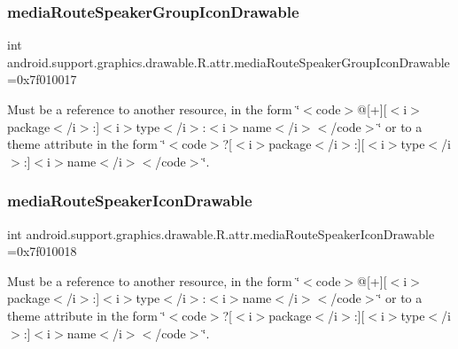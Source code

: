 \subsubsection{\texorpdfstring{media\+Route\+Speaker\+Group\+Icon\+Drawable}{mediaRouteSpeakerGroupIconDrawable}}
{\footnotesize\ttfamily int android.\+support.\+graphics.\+drawable.\+R.\+attr.\+media\+Route\+Speaker\+Group\+Icon\+Drawable =0x7f010017\hspace{0.3cm}{\ttfamily [static]}}

Must be a reference to another resource, in the form \char`\"{}$<$code$>$@\mbox{[}+\mbox{]}\mbox{[}$<$i$>$package$<$/i$>$\+:\mbox{]}$<$i$>$type$<$/i$>$\+:$<$i$>$name$<$/i$>$$<$/code$>$\char`\"{} or to a theme attribute in the form \char`\"{}$<$code$>$?\mbox{[}$<$i$>$package$<$/i$>$\+:\mbox{]}\mbox{[}$<$i$>$type$<$/i$>$\+:\mbox{]}$<$i$>$name$<$/i$>$$<$/code$>$\char`\"{}. \mbox{\label{classandroid_1_1support_1_1graphics_1_1drawable_1_1R_1_1attr_a91dd45a9d20abff52cb43846801486ed}} 
\subsubsection{\texorpdfstring{media\+Route\+Speaker\+Icon\+Drawable}{mediaRouteSpeakerIconDrawable}}
{\footnotesize\ttfamily int android.\+support.\+graphics.\+drawable.\+R.\+attr.\+media\+Route\+Speaker\+Icon\+Drawable =0x7f010018\hspace{0.3cm}{\ttfamily [static]}}

Must be a reference to another resource, in the form \char`\"{}$<$code$>$@\mbox{[}+\mbox{]}\mbox{[}$<$i$>$package$<$/i$>$\+:\mbox{]}$<$i$>$type$<$/i$>$\+:$<$i$>$name$<$/i$>$$<$/code$>$\char`\"{} or to a theme attribute in the form \char`\"{}$<$code$>$?\mbox{[}$<$i$>$package$<$/i$>$\+:\mbox{]}\mbox{[}$<$i$>$type$<$/i$>$\+:\mbox{]}$<$i$>$name$<$/i$>$$<$/code$>$\char`\"{}. \mbox{\label{classandroid_1_1support_1_1graphics_1_1drawable_1_1R_1_1attr_aba5b655903630f8917a8f1fe207a8733}} 
